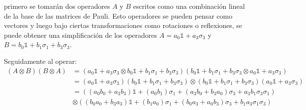\begin{comment}
    =&D+2i\sum_{i} a_i b_i \mathds{1}\otimes \left( \sum_{jl} b_j a_l \varepsilon_{jlr}\sigma_r \right)+2i\left(\sum_{ik} a_i b_k \varepsilon_{ikr}\sigma_r \right)\otimes \sum_{i} b_i a_i\mathds{1}\\
    =&2i\left(C+\sum_{i} a_i b_i \mathds{1}\right)\otimes \left( \sum_{jl} b_j a_l \varepsilon_{jlr}\sigma_r \right)+2i\left(\sum_{ik} a_i b_k \varepsilon_{ikr}\sigma_r \right)\otimes \left(\sum_{i} b_i a_i\mathds{1}+C\right)\\
    =&2i\left(b_0a_0\mathds{1}+ \sum_i (b_0 a_i+b_i a_0)\sigma_i+\sum_{i} a_i b_i \mathds{1}\right)\otimes \left( \sum_{jl} b_j a_l \varepsilon_{jlr}\sigma_r \right)\\
    +&2i\left(\sum_{ik} a_i b_k \varepsilon_{ikr}\sigma_r \right)\otimes \left(b_0a_0\mathds{1}+ \sum_i (b_0 a_i+b_i a_0)\sigma_i+\sum_{i} b_i a_i\mathds{1}\right)\\
    =&-2i\left(\sum_i (b_0 a_i+b_i a_0)\sigma_i+\sum_{\alpha} a_\alpha b_\alpha \mathds{1}\right)\otimes \left( \sum_{lj} a_l b_j \varepsilon_{ljr}\sigma_r \right)\\
    +&2i\left(\sum_{ik} a_i b_k \varepsilon_{ikr}\sigma_r \right)\otimes \left( \sum_i (b_0 a_i+b_i a_0)\sigma_i+\sum_{\alpha} a_\alpha b_\alpha \mathds{1}\right)\\
    =&-2i\left(\sum_i (b_0 a_i+b_i a_0)\sigma_i+ a_0 b_0 \mathds{1}+\vec{a}\cdot \vec{b} \mathds{1}\right)\otimes \vec{a}\times \vec{b} \\
    +&2i\left(\vec{a}\times \vec{b} \right)\otimes \left( \sum_i (b_0 a_i+b_i a_0)\sigma_i+a_0 b_0 \mathds{1}+\vec{a}\cdot \vec{b} \mathds{1}\right)\\
\end{split}\]


\end{comment}
primero se tomarán dos operadores $A$ y $B$ escritos como una combinación lineal de la base de las matrices de Pauli. Esto operadores se pueden pensar como vectores y luego bajo ciertas transformaciones como rotaciones o reflexiones, se puede obtener una simplificación de los operadores $A=a_0\mathds{1}+a_3\sigma_3$ y $B=b_0\mathds{1}+b_1\sigma_1+b_3\sigma_3$. 

Seguidamente al operar:
\[\begin{split}(A\otimes B)(B\otimes A)&= (a_0\mathds{1}+a_3\sigma_3\otimes b_0\mathds{1}+b_1\sigma_1+b_3\sigma_3) (b_0\mathds{1}+b_1\sigma_1+b_3\sigma_3 \otimes a_0\mathds{1}+a_3\sigma_3)\\
&= (a_0\mathds{1}+a_3\sigma_3)( b_0\mathds{1}+b_1\sigma_1+b_3\sigma_3)\otimes (b_0\mathds{1}+b_1\sigma_1+b_3\sigma_3 )(a_0\mathds{1}+a_3\sigma_3)\\
&=((a_0b_0+a_3b_3)\mathds{1}+(a_0b_1)\sigma_1+(a_3b_0+b_3a_0)\sigma_3+a_3b_1\sigma_3\sigma_1)\\
&\otimes ((b_0a_0+b_3a_3)\mathds{1}+(b_1a_0)\sigma_1+(b_0a_3+a_0b_3)\sigma_3+b_1a_3\sigma_1\sigma_3)\\
\end{split}\]


